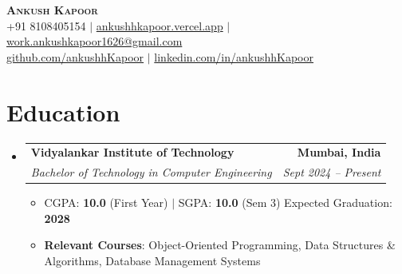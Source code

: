 \documentclass[letterpaper,11pt]{article}
\makeatletter
\newcommand{\resumeItem}[1]{
  \item\small{
    {#1 \vspace{-3pt}}
  }
}
\newcommand{\resumeSubheading}[4]{
  \vspace{-2pt}\item
    \begin{tabular*}{1.0\textwidth}[t]{l@{\extracolsep{\fill}}r}
      \vspace{-2pt}\textbf{#1} & \textbf{\small #2} \\
      \textit{\small#3} & \textit{\small #4} \\
    \end{tabular*}\vspace{-8pt}
} %
\newcommand{\resumeSubHeadingListStart}{\begin{itemize}[leftmargin=0.0in, label={}]}
\newcommand{\resumeSubHeadingListEnd}{\end{itemize}}
\newcommand{\resumeItemListStart}{\begin{itemize}}
\newcommand{\resumeItemListEnd}{\end{itemize}\vspace{-9pt}}
\makeatother
\begin{document}

\begin{center}
    {\huge \scshape \textbf{Ankush Kapoor}} \\ \vspace{5pt}
    +91 8108405154 $|$  \href{https://ankushhkapoor.vercel.app}{ankushhkapoor.vercel.app} $|$
    \href{mailto:work.ankushkapoor1626@gmail.com}{work.ankushkapoor1626@gmail.com} \\
    \href{https://github.com/ankushhKapoor}{github.com/ankushhKapoor} $|$
    \href{https://linkedin.com/in/ankushhKapoor}{linkedin.com/in/ankushhKapoor}    \vspace{-8pt}
    \vspace{-3pt}
\end{center}

\section{Education}
    \resumeSubHeadingListStart
        \resumeSubheading
            {Vidyalankar Institute of Technology}{Mumbai, India}
            {Bachelor of Technology in Computer Engineering}{Sept 2024 -- Present}
            \resumeItemListStart
                \resumeItem{CGPA: \textbf{10.0} (First Year) $|$ SGPA: \textbf{10.0} (Sem 3) \hfill Expected Graduation: \textbf{2028}\hspace{-5pt}}
                \resumeItem{\textbf{Relevant Courses}: Object-Oriented Programming, Data Structures \& Algorithms, Database Management Systems}
            \resumeItemListEnd
    \resumeSubHeadingListEnd
\vspace{-15pt}
\end{document}
